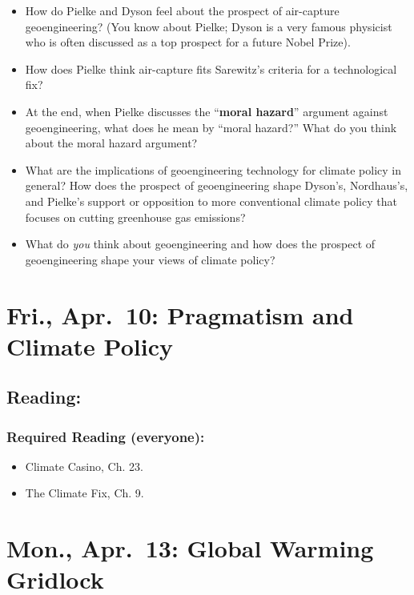 \documentclass[
]{article}
\providecommand{\tightlist}{%
  \setlength{\itemsep}{0pt}\setlength{\parskip}{0pt}}
\begin{document}
\begin{itemize}
\tightlist
\item
  How do Pielke and Dyson feel about the prospect of air-capture
  geoengineering? (You know about Pielke; Dyson is a very famous
  physicist who is often discussed as a top prospect for a future Nobel
  Prize).
\item
  How does Pielke think air-capture fits Sarewitz's criteria for a
  technological fix?
\item
  At the end, when Pielke discusses the ``\textbf{moral hazard}''
  argument against geoengineering, what does he mean by ``moral
  hazard?'' What do you think about the moral hazard argument?
\item
  What are the implications of geoengineering technology for climate
  policy in general? How does the prospect of geoengineering shape
  Dyson's, Nordhaus's, and Pielke's support or opposition to more
  conventional climate policy that focuses on cutting greenhouse gas
  emissions?
\item
  What do \emph{you} think about geoengineering and how does the
  prospect of geoengineering shape your views of climate policy?
\end{itemize}

\hypertarget{fri.-apr.-10-pragmatism-and-climate-policy}{%
\section{Fri., Apr.~10: Pragmatism and Climate
Policy}\label{fri.-apr.-10-pragmatism-and-climate-policy}}

\hypertarget{reading-37}{%
\subsection{Reading:}\label{reading-37}}

\hypertarget{required-reading-everyone-32}{%
\subsubsection{Required Reading
(everyone):}\label{required-reading-everyone-32}}

\begin{itemize}
\tightlist
\item
  Climate Casino, Ch. 23.
\item
  The Climate Fix, Ch. 9.
\end{itemize}

\hypertarget{mon.-apr.-13-global-warming-gridlock}{%
\section{Mon., Apr.~13: Global Warming
Gridlock}\label{mon.-apr.-13-global-warming-gridlock}}
\end{document}

